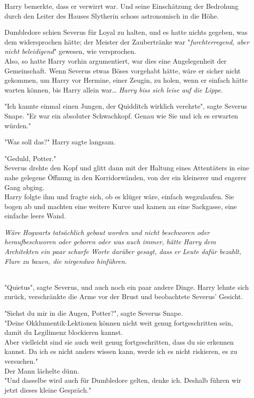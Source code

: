 {Harry bemerkte, dass er verwirrt war. Und seine Einschätzung der Bedrohung durch den Leiter des Hauses Slytherin schoss astronomisch in die Höhe.

Dumbledore schien Severus für Loyal zu halten, und es hatte nichts gegeben, was dem widersprochen hätte; der Meister der Zaubertränke war "\emph{furchterregend, aber nicht beleidigend}" gewesen, wie versprochen.\\ Also, so hatte Harry vorhin argumentiert, war dies eine Angelegenheit der Gemeinschaft. Wenn Severus etwas Böses vorgehabt hätte, wäre er sicher nicht gekommen, um Harry vor Hermine, einer Zeugin, zu holen, wenn er einfach hätte warten können, bis Harry allein war… \emph{Harry biss sich leise auf die Lippe.}

"Ich kannte einmal einen Jungen, der Quidditch wirklich verehrte", sagte Severus Snape. "Er war ein absoluter Schwachkopf. Genau wie Sie und ich es erwarten würden."

"Was soll das?" Harry sagte langsam.

"Geduld, Potter."\\ Severus drehte den Kopf und glitt dann mit der Haltung eines Attentäters in eine nahe gelegene Öffnung in den Korridorwänden, von der ein kleinerer und engerer Gang abging.\\ Harry folgte ihm und fragte sich, ob es klüger wäre, einfach wegzulaufen. Sie bogen ab und machten eine weitere Kurve und kamen an eine Sackgasse, eine einfache leere Wand.

\emph{Wäre Hogwarts tatsächlich gebaut worden und nicht beschworen oder heraufbeschworen oder geboren oder was auch immer, hätte Harry dem Architekten ein paar scharfe Worte darüber gesagt, dass er Leute dafür bezahlt, Flure zu bauen, die nirgendwo hinführen.\\ }\strut \\ "Quietus", sagte Severus, und auch noch ein paar andere Dinge. Harry lehnte sich zurück, verschränkte die Arme vor der Brust und beobachtete Severus' Gesicht.

"Siehst du mir in die Augen, Potter?", sagte Severus Snape.\\ "Deine Okklumentik-Lektionen können nicht weit genug fortgeschritten sein, damit du Legilimenz blockieren kannst.\\ Aber vielleicht sind sie auch weit genug fortgeschritten, dass du sie erkennen kannst. Da ich es nicht anders wissen kann, werde ich es nicht riskieren, es zu versuchen."\\ Der Mann lächelte dünn.\\ "Und dasselbe wird auch für Dumbledore gelten, denke ich. Deshalb führen wir jetzt dieses kleine Gespräch."

}
